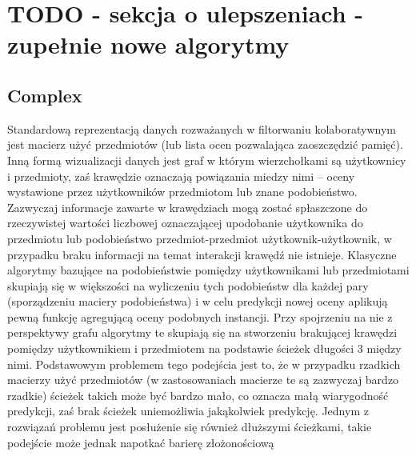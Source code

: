 \documentclass{pracamgr}
\begin{document}
  \section{TODO - sekcja o ulepszeniach - zupełnie nowe algorytmy}
   \subsection{Complex}
    Standardową reprezentacją danych rozważanych w filtorwaniu kolaboratywnym jest macierz użyć przedmiotów (lub lista ocen pozwalająca zaoszczędzić pamięć).
    Inną formą wizualizacji danych jest graf w którym wierzchołkami są użytkownicy i przedmioty, zaś krawędzie oznaczają powiązania miedzy nimi
    -- oceny wystawione przez użytkowników przedmiotom lub znane podobieństwo. Zazwyczaj informacje zawarte w krawędziach mogą zostać spłaszczone do
    rzeczywistej wartości liczbowej oznaczającej upodobanie użytkownika do przedmiotu lub podobieństwo przedmiot-przedmiot użytkownik-użytkownik,
    w przypadku braku informacji na temat interakcji krawędź nie istnieje.
    Klasyczne algorytmy bazujące na podobieństwie pomiędzy użytkownikami lub przedmiotami skupiają się w większości na wyliczeniu tych podobieństw
    dla każdej pary (sporządzeniu maciery podobieństwa) i w celu predykcji nowej oceny aplikują pewną funkcję agregującą oceny podobnych instancji.
    Przy spojrzeniu na nie z perspektywy grafu algorytmy te skupiają się na stworzeniu brakującej krawędzi pomiędzy użytkownikiem i przedmiotem na podstawie
    ścieżek długości 3 między nimi.\newline
    Podstawowym problemem tego podejścia jest to, że w przypadku rzadkich macierzy użyć przedmiotów (w zastosowaniach macierze te są zazwyczaj bardzo rzadkie)
    ścieżek takich może być bardzo mało, co oznacza małą wiarygodność predykcji, zaś brak ścieżek uniemożliwia jakąkolwiek predykcję.
    Jednym z rozwiązań problemu jest posłużenie się również dłuższymi ścieżkami, takie podejście może jednak napotkać barierę złożonościową
\end{document}
